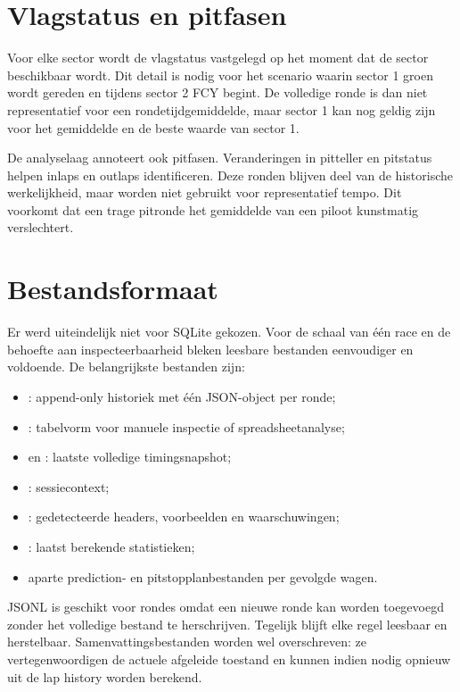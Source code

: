 \section{Vlagstatus en pitfasen}
Voor elke sector wordt de vlagstatus vastgelegd op het moment dat de sector beschikbaar wordt. Dit detail is nodig voor het scenario waarin sector 1 groen wordt gereden en tijdens sector 2 FCY begint. De volledige ronde is dan niet representatief voor een rondetijdgemiddelde, maar sector 1 kan nog geldig zijn voor het gemiddelde en de beste waarde van sector 1.

De analyselaag annoteert ook pitfasen. Veranderingen in pitteller en pitstatus helpen inlaps en outlaps identificeren. Deze ronden blijven deel van de historische werkelijkheid, maar worden niet gebruikt voor representatief tempo. Dit voorkomt dat een trage pitronde het gemiddelde van een piloot kunstmatig verslechtert.

\section{Bestandsformaat}
Er werd uiteindelijk niet voor SQLite gekozen. Voor de schaal van één race en de behoefte aan inspecteerbaarheid bleken leesbare bestanden eenvoudiger en voldoende. De belangrijkste bestanden zijn:

\begin{itemize}
  \item {}: append-only historiek met één JSON-object per ronde;
  \item {}: tabelvorm voor manuele inspectie of spreadsheetanalyse;
  \item {} en : laatste volledige timingsnapshot;
  \item {}: sessiecontext;
  \item {}: gedetecteerde headers, voorbeelden en waarschuwingen;
  \item {}: laatst berekende statistieken;
  \item aparte prediction- en pitstopplanbestanden per gevolgde wagen.
\end{itemize}

JSONL is geschikt voor rondes omdat een nieuwe ronde kan worden toegevoegd zonder het volledige bestand te herschrijven. Tegelijk blijft elke regel leesbaar en herstelbaar. Samenvattingsbestanden worden wel overschreven: ze vertegenwoordigen de actuele afgeleide toestand en kunnen indien nodig opnieuw uit de lap history worden berekend.

